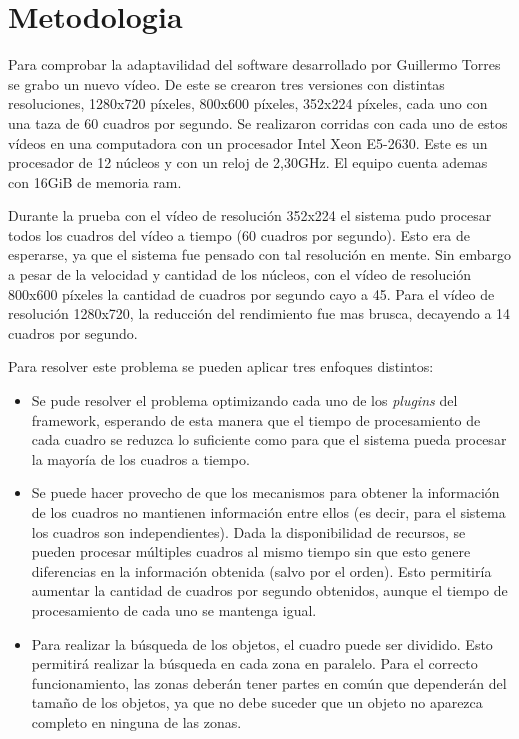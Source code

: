 
\section{Metodologia}

Para comprobar la adaptavilidad del software desarrollado por Guillermo Torres
se grabo un nuevo vídeo. De este se crearon tres versiones con distintas
resoluciones, 1280x720 píxeles, 800x600 píxeles, 352x224 píxeles, cada uno con
una taza de 60 cuadros por segundo. Se realizaron corridas con cada uno de estos
vídeos en una computadora con un procesador Intel Xeon E5-2630. Este es un
procesador de 12 núcleos y con un reloj de 2,30GHz. El equipo cuenta ademas con
16GiB de memoria ram.

Durante la prueba con el vídeo de resolución 352x224 el sistema pudo procesar
todos los cuadros del vídeo a tiempo (60 cuadros por segundo). Esto era de
esperarse, ya que el sistema fue pensado con tal resolución en mente. Sin
embargo a pesar de la velocidad y cantidad de los núcleos, con el vídeo de
resolución 800x600 píxeles la cantidad de cuadros por segundo cayo a 45. Para el
vídeo de resolución 1280x720, la reducción del rendimiento fue mas brusca,
decayendo a 14 cuadros por segundo.

Para resolver este problema se pueden aplicar tres enfoques distintos:

\begin{itemize}

\item	Se pude resolver el problema optimizando cada uno de los \emph{plugins}
	del framework, esperando de esta manera que el tiempo de procesamiento
	de cada cuadro se reduzca lo suficiente como para que el sistema pueda
	procesar la mayoría de los cuadros a tiempo.

\item	Se puede hacer provecho de que los mecanismos para obtener la
	información de los cuadros no mantienen información entre ellos (es
	decir, para el sistema los cuadros son independientes). Dada la
	disponibilidad de recursos, se pueden procesar múltiples cuadros al
	mismo tiempo sin que esto genere diferencias en la información obtenida
	(salvo por el orden). Esto permitiría aumentar la cantidad de cuadros
	por segundo obtenidos, aunque el tiempo de procesamiento de cada uno se
	mantenga igual.

\item	Para realizar la búsqueda de los objetos, el cuadro puede ser dividido.
	Esto permitirá realizar la búsqueda en cada zona en paralelo. Para el
	correcto funcionamiento, las zonas deberán tener partes en común que
	dependerán del tamaño de los objetos, ya que no debe suceder que un
	objeto no aparezca completo en ninguna de las zonas.

\end{itemize}

